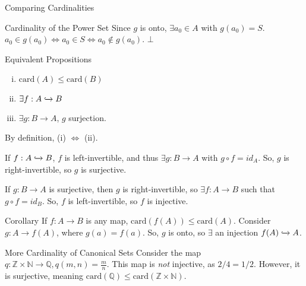 \documentclass[8pt]{extarticle}
\begin{document}
\begin{problem}{Comparing Cardinalities}
\begin{problem}{Cardinality of the Power Set}
      Since $g$ is onto, $\exists a_0\in A$ with $g(a_0) = S$. $a_0 \in g(a_0) \Leftrightarrow a_0\in S \Leftrightarrow a_0\notin g(a_0)$. $\bot$
    \end{problem}
    \begin{problem}{Equivalent Propositions}
      \begin{enumerate}[(i)]
        \item $\text{card}(A) \leq \text{card}(B)$
        \item $\exists f: A\xhookrightarrow{} B$
        \item $\exists g: B\rightarrow A$, $g$ surjection.
      \end{enumerate}
      \tcblower
      By definition, (i) $\Leftrightarrow$ (ii).
      \begin{description}[font=\normalfont]
        \item[(ii) $\Rightarrow$ (iii)] If $f: A\xhookrightarrow{} B$, $f$ is left-invertible, and thus $\exists g: B\rightarrow A$ with $g\circ f = id_A$. So, $g$ is right-invertible, so $g$ is surjective.
        \item[(iii) $\Rightarrow$ (ii)] If $g: B \rightarrow A$ is surjective, then $g$ is right-invertible, so $\exists f: A\rightarrow B$ such that $g\circ f = id_B$. So, $f$ is left-invertible, so $f$ is injective.
      \end{description}
    \end{problem}
    \begin{problem}{Corollary}
      If $f: A\rightarrow B$ is any map, $\text{card}(f(A)) \leq \text{card}(A)$.
      \tcblower
      Consider $g: A\rightarrow f(A)$, where $g(a) = f(a)$. So, $g$ is onto, so $\exists$ an injection $f(A) \xhookrightarrow{} A$.
    \end{problem}
    \begin{problem}{More Cardinality of Canonical Sets}
      Consider the map $q: \mathbb{Z} \times \mathbb{N} \rightarrow \mathbb{Q}, q(m,n) = \frac{m}{n}$. This map is \textit{not} injective, as $2/4 = 1/2$. However, it is surjective, meaning $\text{card}(\mathbb{Q}) \leq \text{card}(\mathbb{Z} \times \mathbb{N})$.\\


\end{problem}
\end{problem}
\end{document}
